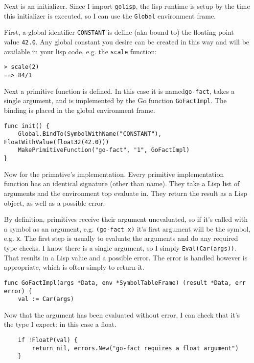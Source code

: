 \documentclass{scrartcl}
\begin{document}
Next is an initializer. Since I import \texttt{golisp}, the lisp runtime is
setup by the time this initializer is executed, so I can use the
\texttt{Global} environment frame.

First, a global identifier \texttt{CONSTANT} is define (aka bound to) the
floating point value \texttt{42.0}. Any global constant you desire can be
created in this way and will be available in your lisp code, e.g.
the \texttt{scale} function:

\begin{verbatim}> scale(2)
==> 84/1
\end{verbatim}

Next a primitive function is defined. In this case it is
named\texttt{go-fact}, takes a single argument, and is implemented by the Go
function \texttt{GoFactImpl}. The binding is placed in the global environment
frame.

\begin{verbatim}func init() {
    Global.BindTo(SymbolWithName("CONSTANT"), FloatWithValue(float32(42.0)))
    MakePrimitiveFunction("go-fact", "1", GoFactImpl)
}
\end{verbatim}

Now for the primative's implementation. Every primitive implementation
function has an identical signature (other than name). They take a
Lisp list of arguments and the environment top evaluate in. They
return the result as a Lisp object, as well as a possible error.

By definition, primitives receive their argument unevaluated, so if
it's called with a symbol as an argument, e.g. \texttt{(go-fact x)} it's
first argument will be the symbol, e.g. \texttt{x}. The first step is usually
to evaluate the arguments and do any required type checks. I know
there is a single argument, so I simply \texttt{Eval(Car(args))}. That
results in a Lisp value and a possible error. The error is handled
however is appropriate, which is often simply to return it.

\begin{verbatim}func GoFactImpl(args *Data, env *SymbolTableFrame) (result *Data, err error) {
    val := Car(args)
\end{verbatim}

Now that the argument has been evaluated without error, I can check
that it's the type I expect: in this case a float.

\begin{verbatim}    if !FloatP(val) {
        return nil, errors.New("go-fact requires a float argument")
    }
\end{verbatim}
\end{document}
